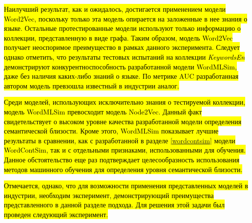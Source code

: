 \hl{Наилучший результат, как и ожидалось, достигается применением модели Word2Vec, поскольку только эта модель опирается на заложенные в нее знания о языке. Остальные протестированные модели используют только информацию о коллекции, представленную в виде графа. Таким образом, модель Word2Vec получает неоспоримое преимущество в рамках данного эксперимента. Следует однако отметить, что результаты тестовых испытаний на коллекции \emph{KeywordsEn} демонстрируют конкурентноспособность разработанной модели WordMLSim, даже без наличия каких-либо знаний о языке. По метрике AUC разработанная автором модель превзошла известный в индустрии аналог.}

\hl{Среди моделей, использующих исключительно знания о тестируемой коллекции, модель WordMLSim превосходит модель Node2Vec. Данный факт свидетельствует о высоком уровне качества разработанной модели определения семантической близости. Кроме этого, WordMLSim показывает лучшие результаты в сравнении, как с разработанной в разделе \ref{wordcontsim} модели WordContSim, так и с отдельными признаками, использованными для обучения. Данное обстоятельство еще раз подтверждает целесообразность использования методов машинного обучения для определения уровня семантической близости.}

\hl{Отмечается, однако, что для возможности применения представленных моделей в индустрии, необходим эксперимент, демонстрирующий преимущества представленного в данной разделе подхода. Для решения этой задачи был проведен следующий эксперимент.}


